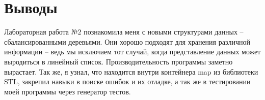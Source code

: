 \section{Выводы}
Лабораторная работа $№2$ познакомила меня с новыми структурами данных -- сбалансированными деревьями. Они хорошо подходят для хранения различной информации -- ведь мы исключаем тот случай, когда представление данных может выродиться в линейный список. Производительность программы заметно вырастает. Так же, я узнал, что находится внутри контейнера map из библиотеки STL, закрепил навыки в поиске ошибок и их отладке, а так же в тестировании моей программы через генератор тестов.  
\pagebreak